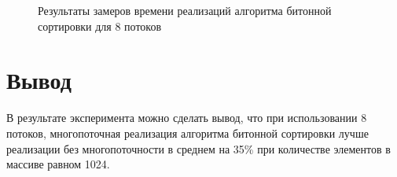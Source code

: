 \begin{figure}[ph!]
	\caption{Результаты замеров времени реализаций алгоритма битонной сортировки для 8 потоков}
	\label{fig:timings_fixed_threads}
\end{figure}

\clearpage

\section*{Вывод}

В результате эксперимента можно сделать вывод, что при использовании 8 потоков, многопоточная реализация алгоритма битонной сортировки лучше реализации без многопоточности в среднем на 35\% при количестве элементов в массиве равном 1024. 


